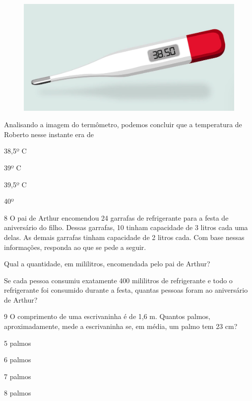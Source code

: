 \begin{figure}[htpb!]
\centering
\includegraphics[width=.5\textwidth]{./media/image47.png}
\end{figure}

Analisando a imagem do termômetro, podemos concluir que a temperatura de Roberto nesse instante era de

\begin{minipage}{.5\textwidth}
\begin{escolha}

\item
  38,5º C
\item
  39º C
\item
  39,5º C
\item
  40º
\end{escolha}
\end{minipage}

\num{8} O pai de Arthur encomendou 24 garrafas de
refrigerante para a festa de aniversário do filho. Dessas garrafas, 10 tinham capacidade de 3 litros cada uma delas. As demais garrafas tinham capacidade de 2 litros cada. Com base nessas
informações, responda ao que se pede a seguir.

\begin{escolha}
\item Qual a quantidade, em mililitros, encomendada pelo pai de Arthur?

\item Se cada pessoa consumiu exatamente 400 mililitros de refrigerante e
  todo o refrigerante foi consumido durante a festa, quantas pessoas
  foram ao aniversário de Arthur?
\end{escolha}

\num{9} O comprimento de uma escrivaninha é de 1,6 m. Quantos palmos,
aproximadamente, mede a escrivaninha se, em média, um palmo tem 23 cm?

\begin{minipage}{.5\textwidth}
\begin{escolha}
\item
  5 palmos
\item
  6 palmos
\item
  7 palmos
\item
  8 palmos
\end{escolha}
\end{minipage}

